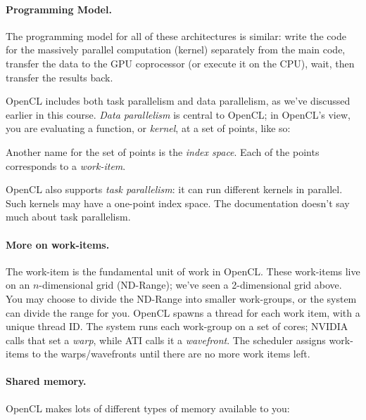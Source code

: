 \paragraph{Programming Model.} The programming
model for all of these architectures is similar: write the code for
the massively parallel computation (kernel) separately from the main
code, transfer the data to the GPU coprocessor (or execute it on the
CPU), wait, then transfer the results back.

OpenCL includes both task parallelism and data parallelism, as we've
discussed earlier in this course. \emph{Data parallelism} is central to
OpenCL; in OpenCL's view, you are evaluating a function, or \emph{kernel},
at a set of points, like so:

\begin{center}
\end{center}

Another name for the set of points is the \emph{index space}. 
Each of the points corresponds to a \emph{work-item}.

OpenCL also supports \emph{task parallelism}: it can run different
kernels in parallel. Such kernels may have a one-point index space.
The documentation doesn't say much about task parallelism.

\paragraph{More on work-items.} The work-item is the fundamental
unit of work in OpenCL. These work-items live on an $n$-dimensional
grid (ND-Range); we've seen a 2-dimensional grid above. You may choose
to divide the ND-Range into smaller work-groups, or the system can
divide the range for you. OpenCL spawns a thread for each work item,
with a unique thread ID. The system runs each work-group on a set of
cores; NVIDIA calls that set a \emph{warp}, while ATI calls it a
\emph{wavefront}. The scheduler assigns work-items to the
warps/wavefronts until there are no more work items left.

\paragraph{Shared memory.} OpenCL makes lots of different types of
memory available to you:

